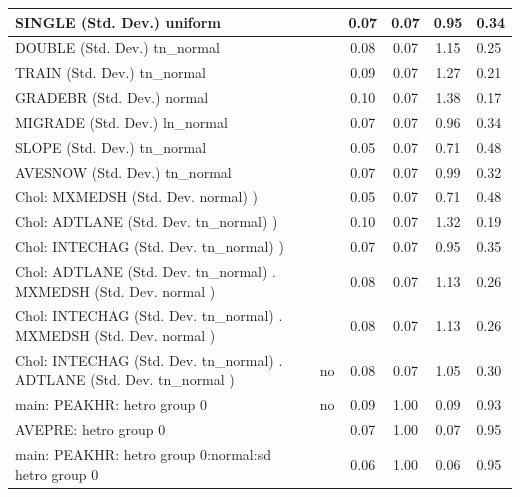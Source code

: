 \begin{table}
\begin{center}
\begin{tabular}{|l|l|c|c|c|l|}
			\hline
			SINGLE (Std. Dev.) uniform &  & 0.07 & 0.07 & 0.95 & 0.34 \\
			\hline
			DOUBLE (Std. Dev.) tn_normal &  & 0.08 & 0.07 & 1.15 & 0.25 \\
			\hline
			TRAIN (Std. Dev.) tn_normal &  & 0.09 & 0.07 & 1.27 & 0.21 \\
			\hline
			GRADEBR (Std. Dev.) normal &  & 0.10 & 0.07 & 1.38 & 0.17 \\
			\hline
			MIGRADE (Std. Dev.) ln_normal &  & 0.07 & 0.07 & 0.96 & 0.34 \\
			\hline
			SLOPE (Std. Dev.) tn_normal &  & 0.05 & 0.07 & 0.71 & 0.48 \\
			\hline
			AVESNOW (Std. Dev.) tn_normal &  & 0.07 & 0.07 & 0.99 & 0.32 \\
			\hline
			 Chol: MXMEDSH (Std. Dev. normal) ) &  & 0.05 & 0.07 & 0.71 & 0.48 \\
			\hline
			 Chol: ADTLANE (Std. Dev. tn_normal) ) &  & 0.10 & 0.07 & 1.32 & 0.19 \\
			\hline
			 Chol: INTECHAG (Std. Dev. tn_normal) ) &  & 0.07 & 0.07 & 0.95 & 0.35 \\
			\hline
			 Chol: ADTLANE (Std. Dev. tn_normal) . MXMEDSH (Std. Dev.   normal ) &  & 0.08 & 0.07 & 1.13 & 0.26 \\
			\hline
			 Chol: INTECHAG (Std. Dev. tn_normal) . MXMEDSH (Std. Dev.   normal ) &  & 0.08 & 0.07 & 1.13 & 0.26 \\
			\hline
			 Chol: INTECHAG (Std. Dev. tn_normal) . ADTLANE (Std. Dev.   tn_normal ) & no & 0.08 & 0.07 & 1.05 & 0.30 \\
			\hline
			main: PEAKHR: hetro group 0 & no & 0.09 & 1.00 & 0.09 & 0.93 \\
			\hline
			AVEPRE: hetro group 0 &  & 0.07 & 1.00 & 0.07 & 0.95 \\
			\hline
			main: PEAKHR: hetro group 0:normal:sd  hetro group 0 &  & 0.06 & 1.00 & 0.06 & 0.95 \\
			\hline
		\end{tabular}
	\end{center}
\end{table}